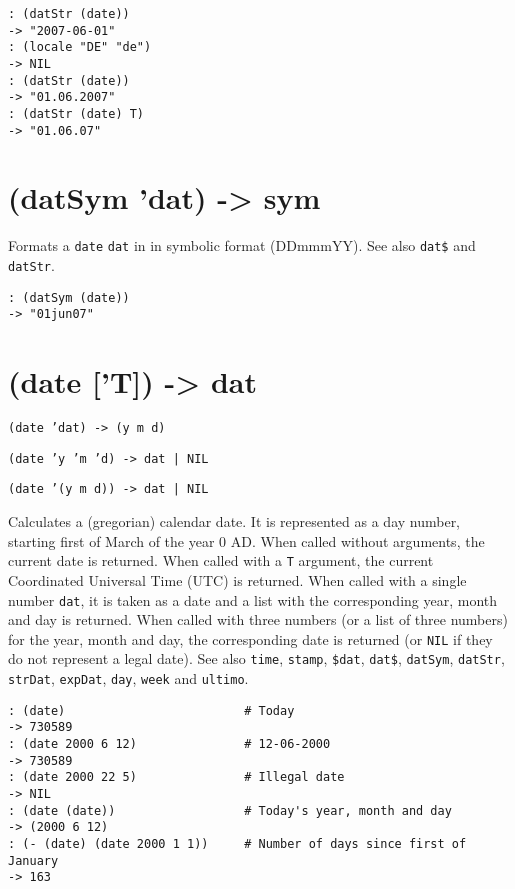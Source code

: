 {{\begin{verbatim}
: (datStr (date))
-> "2007-06-01"
: (locale "DE" "de")
-> NIL
: (datStr (date))
-> "01.06.2007"
: (datStr (date) T)
-> "01.06.07"
\end{verbatim}

 
\section{(datSym 'dat) -> sym}
\label{sec-8-1-4-10}


Formats a \texttt{date} \texttt{dat} in in symbolic format (DDmmmYY). See also \texttt{dat\$}
and \texttt{datStr}.


\begin{verbatim}
: (datSym (date))
-> "01jun07"
\end{verbatim}

 
\section{(date ['T]) -> dat}
\label{sec-8-1-4-11}


\texttt{(date 'dat) -> (y m d)}

\texttt{(date 'y 'm 'd) -> dat | NIL}

\texttt{(date '(y m d)) -> dat | NIL}

Calculates a (gregorian) calendar date. It is represented as a day
number, starting first of March of the year 0 AD. When called without
arguments, the current date is returned. When called with a \texttt{T}
argument, the current Coordinated Universal Time (UTC) is returned. When
called with a single number \texttt{dat}, it is taken as a date and a list with
the corresponding year, month and day is returned. When called with
three numbers (or a list of three numbers) for the year, month and day,
the corresponding date is returned (or \texttt{NIL} if they do not represent a
legal date). See also \texttt{time}, \texttt{stamp}, \texttt{\$dat}, \texttt{dat\$}, \texttt{datSym},
\texttt{datStr}, \texttt{strDat}, \texttt{expDat}, \texttt{day}, \texttt{week} and \texttt{ultimo}.


\begin{verbatim}
: (date)                         # Today
-> 730589
: (date 2000 6 12)               # 12-06-2000
-> 730589
: (date 2000 22 5)               # Illegal date
-> NIL
: (date (date))                  # Today's year, month and day
-> (2000 6 12)
: (- (date) (date 2000 1 1))     # Number of days since first of January
-> 163
\end{verbatim}

}}
